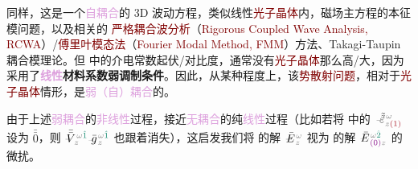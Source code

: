 同样，这是一个\textcolor{Plum}{自耦合}的 3D 波动方程，类似线性\textcolor{Maroon}{光子晶体}内，磁场主方程的\textcolor{PineGreen}{本征模问题}\cite{sakodaOpticalPropertiesPhotonic2005,joannopoulosPhotonicCrystalsMolding2008}，以及相关的 \textcolor{Maroon}{严格耦合波分析}（\textcolor{Maroon}{Rigorous Coupled Wave Analysis, RCWA}）/\textcolor{Maroon}{傅里叶模态法}（\textcolor{Maroon}{Fourier Modal Method, FMM}）方法\cite{liNoteSmatrixPropagation2003,wangLargeScaleMetasurfaceSimulation2025}、Takagi-Taupin 耦合模理论。但  中的介电常数起伏/对比度，通常没有\textcolor{Maroon}{光子晶体}那么高/大，因为采用了\textbf{\textcolor{Plum}{线性}材料系数\textcolor{NavyBlue}{弱调制}条件}。因此，从某种程度上，该\textcolor{Maroon}{势散射问题}，相对于\textcolor{Maroon}{光子晶体}情形，是\textcolor{Plum}{弱（自）耦合}的。

由于上述\textcolor{Plum}{弱耦合}的\textcolor{Plum}{非线性}过程，接近\textcolor{Plum}{无耦合}的纯\textcolor{Plum}{线性}过程（比如若将  中的 $\xint{\begin{smallmatrix} ~ \\ {}^{}_{\mathcolor{gray}{-}} \\ ~ \end{smallmatrix}}{16}{\tilde{\tilde{\varepsilon}}}^{\;\! \mathcolor{gray}{\omega}}_{\mathcolor{gray}{z} \textcolor{Maroon}{(1)}}$ 设为 $\bar{\bar{0}}$，则 $\xint{\mathcolor{gray}{-}}{21}{\bar{\bar{V}}}^{\;\! \mathcolor{gray}{\omega} \textcolor{PineGreen}{\hat{1}}}_{\;\! \mathcolor{gray}{z}} \xint{{}^{}_{\mathcolor{gray}{-}}}{10}{\bar{g}}^{\;\!\mathcolor{gray}{\omega} \textcolor{PineGreen}{\hat{1}}}_{\;\! \mathcolor{gray}{z}}$ 也跟着消失），这启发我们将  的解 $\xint{\mathcolor{gray}{-}}{255}{\bar{E}}^{\;\! \mathcolor{gray}{\omega} }_{\;\! \mathcolor{gray}{z}}$ 视为  的解 $\xint{\mathcolor{gray}{-}}{255}{\bar{E}}^{\;\! \mathcolor{gray}{\omega} \textcolor{PineGreen}{\hat{2}}}_{\;\! \textcolor{Plum}{(0)} \mathcolor{gray}{z}}$ 的\textcolor{NavyBlue}{微扰}。

